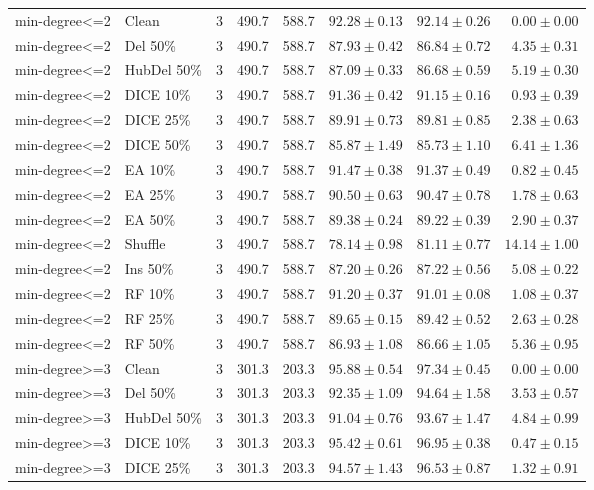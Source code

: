 {\begin{longtable}{llrrrrrr}
min-degree<=2 & Clean & 3 & 490.7 & 588.7 & $92.28\pm0.13$ & $92.14\pm0.26$ & $0.00\pm0.00$ \\
min-degree<=2 & Del 50\% & 3 & 490.7 & 588.7 & $87.93\pm0.42$ & $86.84\pm0.72$ & $4.35\pm0.31$ \\
min-degree<=2 & HubDel 50\% & 3 & 490.7 & 588.7 & $87.09\pm0.33$ & $86.68\pm0.59$ & $5.19\pm0.30$ \\
min-degree<=2 & DICE 10\% & 3 & 490.7 & 588.7 & $91.36\pm0.42$ & $91.15\pm0.16$ & $0.93\pm0.39$ \\
min-degree<=2 & DICE 25\% & 3 & 490.7 & 588.7 & $89.91\pm0.73$ & $89.81\pm0.85$ & $2.38\pm0.63$ \\
min-degree<=2 & DICE 50\% & 3 & 490.7 & 588.7 & $85.87\pm1.49$ & $85.73\pm1.10$ & $6.41\pm1.36$ \\
min-degree<=2 & EA 10\% & 3 & 490.7 & 588.7 & $91.47\pm0.38$ & $91.37\pm0.49$ & $0.82\pm0.45$ \\
min-degree<=2 & EA 25\% & 3 & 490.7 & 588.7 & $90.50\pm0.63$ & $90.47\pm0.78$ & $1.78\pm0.63$ \\
min-degree<=2 & EA 50\% & 3 & 490.7 & 588.7 & $89.38\pm0.24$ & $89.22\pm0.39$ & $2.90\pm0.37$ \\
min-degree<=2 & Shuffle & 3 & 490.7 & 588.7 & $78.14\pm0.98$ & $81.11\pm0.77$ & $14.14\pm1.00$ \\
min-degree<=2 & Ins 50\% & 3 & 490.7 & 588.7 & $87.20\pm0.26$ & $87.22\pm0.56$ & $5.08\pm0.22$ \\
min-degree<=2 & RF 10\% & 3 & 490.7 & 588.7 & $91.20\pm0.37$ & $91.01\pm0.08$ & $1.08\pm0.37$ \\
min-degree<=2 & RF 25\% & 3 & 490.7 & 588.7 & $89.65\pm0.15$ & $89.42\pm0.52$ & $2.63\pm0.28$ \\
min-degree<=2 & RF 50\% & 3 & 490.7 & 588.7 & $86.93\pm1.08$ & $86.66\pm1.05$ & $5.36\pm0.95$ \\
min-degree>=3 & Clean & 3 & 301.3 & 203.3 & $95.88\pm0.54$ & $97.34\pm0.45$ & $0.00\pm0.00$ \\
min-degree>=3 & Del 50\% & 3 & 301.3 & 203.3 & $92.35\pm1.09$ & $94.64\pm1.58$ & $3.53\pm0.57$ \\
min-degree>=3 & HubDel 50\% & 3 & 301.3 & 203.3 & $91.04\pm0.76$ & $93.67\pm1.47$ & $4.84\pm0.99$ \\
min-degree>=3 & DICE 10\% & 3 & 301.3 & 203.3 & $95.42\pm0.61$ & $96.95\pm0.38$ & $0.47\pm0.15$ \\
min-degree>=3 & DICE 25\% & 3 & 301.3 & 203.3 & $94.57\pm1.43$ & $96.53\pm0.87$ & $1.32\pm0.91$ \\

\end{longtable}}
